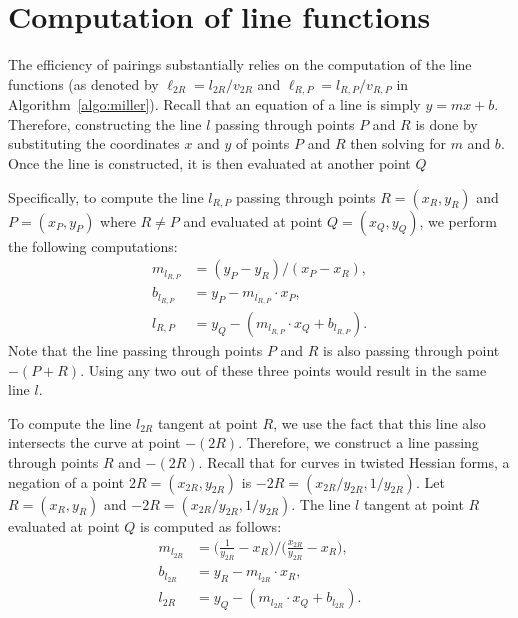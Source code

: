 \section{Computation of line functions}
\label{sec:lines}

The efficiency of pairings substantially relies on the computation of the line functions
(as denoted by $\ell_{2R} = l_{2R}/v_{2R}$ and $\ell_{R,P} = l_{R,P}/v_{R,P}$ in Algorithm~\ref{algo:miller}).
Recall that an equation of a line is simply $y = mx + b$.
Therefore, constructing the line $l$ passing through points $P$ and $R$
is done by substituting the coordinates $x$ and $y$ of points $P$ and $R$
then solving for $m$ and $b$.
Once the line is constructed, it is then evaluated at another point $Q$

Specifically, to compute the line $l_{R,P}$ passing through
points $R = (x_R, y_R)$ and $P = (x_P, y_P)$ where $R \ne P$
and evaluated at point $Q = (x_Q, y_Q)$,
we perform the following computations:
\begin{align*}
m_{l_{R,P}} &= (y_P - y_R)/(x_P - x_R),			\\
b_{l_{R,P}} &= y_P - m_{l_{R,P}} \cdot x_P,		\\
l_{R,P} &= y_Q - (m_{l_{R,P}} \cdot x_Q + b_{l_{R,P}}). 
\end{align*}
Note that %
the line passing through points $P$ and $R$ is also passing through point $-(P+R)$.
Using any two out of these three points would result in the same line $l$.

To compute the line $l_{2R}$ tangent at point $R$,
we use the fact that this line also intersects the curve at point $-(2R)$.
Therefore, we construct a line passing through points $R$ and $-(2R)$.
Recall that for curves in twisted Hessian forms,
a negation of a point $2R = (x_{2R}, y_{2R})$ is $-2R = (x_{2R}/y_{2R}, 1/y_{2R})$.
Let $R = (x_{R}, y_{R})$
and $-2R = (x_{2R}/y_{2R}, 1/y_{2R})$. %
The line $l$ tangent at point $R$ evaluated at point $Q$ is computed as follows:
\begin{align*}
m_{l_{2R}} &= \bigg( \frac{1}{y_{2R}} - x_{R} \bigg) / \bigg( \frac{x_{2R}}{y_{2R}} - x_{R} \bigg),	\\
b_{l_{2R}} &= y_R - m_{l_{2R}} \cdot x_R,		\\
l_{2R} &= y_Q - (m_{l_{2R}} \cdot x_Q + b_{l_{2R}}).
\end{align*}

